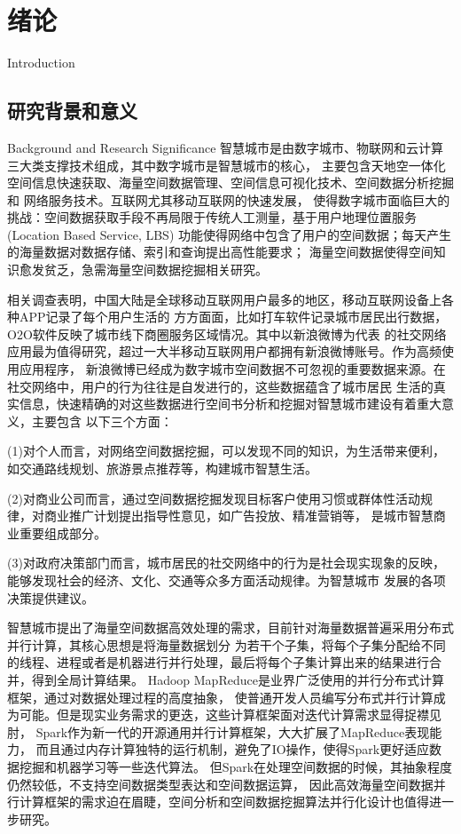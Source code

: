 \chapter{绪论}{Introduction}
\section{研究背景和意义}{Background and Research Significance}
智慧城市是由数字城市、物联网和云计算三大类支撑技术组成，其中数字城市是智慧城市的核心，
主要包含天地空一体化空间信息快速获取、海量空间数据管理、空间信息可视化技术、空间数据分析挖掘和
网络服务技术\cite{李德仁2013智慧地球时代测绘地理信息学的新使命}。互联网尤其移动互联网的快速发展，
使得数字城市面临巨大的挑战：空间数据获取手段不再局限于传统人工测量，基于用户地理位置服务(Location Based Service, LBS)
功能使得网络中包含了用户的空间数据；每天产生的海量数据对数据存储、索引和查询提出高性能要求；
海量空间数据使得空间知识愈发贫乏，急需海量空间数据挖掘相关研究。

相关调查表明，中国大陆是全球移动互联网用户最多的地区，移动互联网设备上各种APP记录了每个用户生活的
方方面面，比如打车软件记录城市居民出行数据，O2O软件反映了城市线下商圈服务区域情况。其中以新浪微博为代表
的社交网络应用最为值得研究，超过一大半移动互联网用户都拥有新浪微博账号。作为高频使用应用程序，
新浪微博已经成为数字城市空间数据不可忽视的重要数据来源。在社交网络中，用户的行为往往是自发进行的，这些数据蕴含了城市居民
生活的真实信息，快速精确的对这些数据进行空间书分析和挖掘对智慧城市建设有着重大意义，主要包含
以下三个方面：

(1)对个人而言，对网络空间数据挖掘，可以发现不同的知识，为生活带来便利，如交通路线规划、旅游景点推荐等，构建城市智慧生活。

(2)对商业公司而言，通过空间数据挖掘发现目标客户使用习惯或群体性活动规律，对商业推广计划提出指导性意见，如广告投放、精准营销等，
是城市智慧商业重要组成部分。

(3)对政府决策部门而言，城市居民的社交网络中的行为是社会现实现象的反映，能够发现社会的经济、文化、交通等众多方面活动规律。为智慧城市
发展的各项决策提供建议。

智慧城市提出了海量空间数据高效处理的需求，目前针对海量数据普遍采用分布式并行计算，其核心思想是将海量数据划分
为若干个子集，将每个子集分配给不同的线程、进程或者是机器进行并行处理，最后将每个子集计算出来的结果进行合并，得到全局计算结果。
Hadoop MapReduce\cite{Shvachko2010The}是业界广泛使用的并行分布式计算框架，通过对数据处理过程的高度抽象，
使普通开发人员编写分布式并行计算成为可能。但是现实业务需求的更迭，这些计算框架面对迭代计算需求显得捉襟见肘，
Spark作为新一代的开源通用并行计算框架\cite{Zaharia2010Spark}，大大扩展了MapReduce表现能力，
而且通过内存计算独特的运行机制，避免了IO操作，使得Spark更好适应数据挖掘和机器学习等一些迭代算法\cite{李文栋2015基于}。
但Spark在处理空间数据的时候，其抽象程度仍然较低，不支持空间数据类型表达和空间数据运算，
因此高效海量空间数据并行计算框架的需求迫在眉睫，空间分析和空间数据挖掘算法并行化设计也值得进一步研究。

